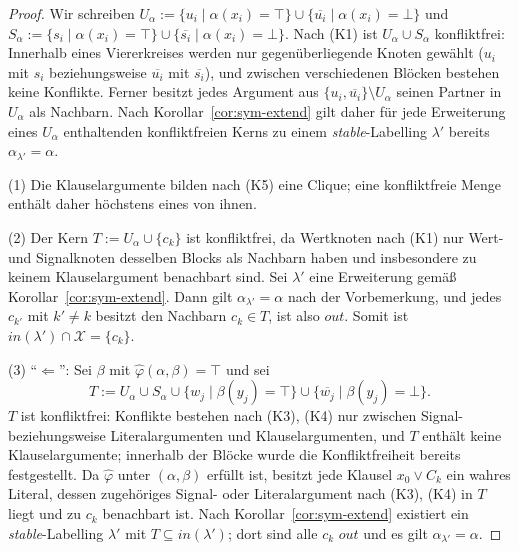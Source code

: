 \begin{proof}
    Wir schreiben \(U_\alpha:=\{u_i\mid\alpha(x_i)=\top\}
    \cup\{\overline{u_i}\mid\alpha(x_i)=\bot\}\) und
    \(S_\alpha:=\{s_i\mid\alpha(x_i)=\top\}
    \cup\{\overline{s_i}\mid\alpha(x_i)=\bot\}\).
    Nach (K1) ist \(U_\alpha\cup S_\alpha\) konfliktfrei: Innerhalb eines
    Viererkreises werden nur gegenüberliegende Knoten gewählt
    (\(u_i\) mit \(s_i\) beziehungsweise \(\overline{u_i}\) mit
    \(\overline{s_i}\)), und zwischen verschiedenen Blöcken bestehen keine
    Konflikte. Ferner besitzt jedes Argument aus
    \(\{u_i,\overline{u_i}\}\setminus U_\alpha\) seinen Partner in
    \(U_\alpha\) als Nachbarn. Nach Korollar~\ref{cor:sym-extend} gilt
    daher für jede Erweiterung eines \(U_\alpha\) enthaltenden konfliktfreien
    Kerns zu einem \textit{stable}-Labelling \(\lambda'\) bereits
    \(\alpha_{\lambda'}=\alpha\).

    (1) Die Klauselargumente bilden nach (K5) eine Clique; eine konfliktfreie
    Menge enthält daher höchstens eines von ihnen.

    (2) Der Kern \(T:=U_\alpha\cup\{c_k\}\) ist konfliktfrei, da Wertknoten
    nach (K1) nur Wert- und Signalknoten desselben Blocks als Nachbarn haben
    und insbesondere zu keinem Klauselargument benachbart sind. Sei
    \(\lambda'\) eine Erweiterung gemäß Korollar~\ref{cor:sym-extend}. Dann gilt
    \(\alpha_{\lambda'}=\alpha\) nach der Vorbemerkung, und jedes \(c_{k'}\)
    mit \(k'\neq k\) besitzt den Nachbarn \(c_k\in T\), ist also
    \(\mathit{out}\). Somit ist
    \(\mathit{in}(\lambda')\cap\mathcal{X}=\{c_k\}\).

    (3) \enquote{\(\Leftarrow\)}: Sei \(\beta\) mit
    \(\widehat{\varphi}(\alpha,\beta)=\top\) und sei
    \[
        T:=U_\alpha\cup S_\alpha\cup
        \{w_j\mid\beta(y_j)=\top\}\cup\{\overline{w_j}\mid\beta(y_j)=\bot\}.
    \]
    \(T\) ist konfliktfrei: Konflikte bestehen nach (K3), (K4) nur zwischen
    Signal- beziehungsweise Literalargumenten und Klauselargumenten, und
    \(T\) enthält keine Klauselargumente; innerhalb der Blöcke wurde die
    Konfliktfreiheit bereits festgestellt. Da \(\widehat{\varphi}\) unter
    \((\alpha,\beta)\) erfüllt ist, besitzt jede Klausel \(x_0\lor C_k\) ein
    wahres Literal, dessen zugehöriges Signal- oder Literalargument nach (K3),
    (K4) in \(T\) liegt und zu \(c_k\) benachbart ist. Nach
    Korollar~\ref{cor:sym-extend} existiert ein \textit{stable}-Labelling
    \(\lambda'\) mit \(T\subseteq\mathit{in}(\lambda')\); dort sind alle
    \(c_k\) \(\mathit{out}\) und es gilt \(\alpha_{\lambda'}=\alpha\).


\end{proof}
